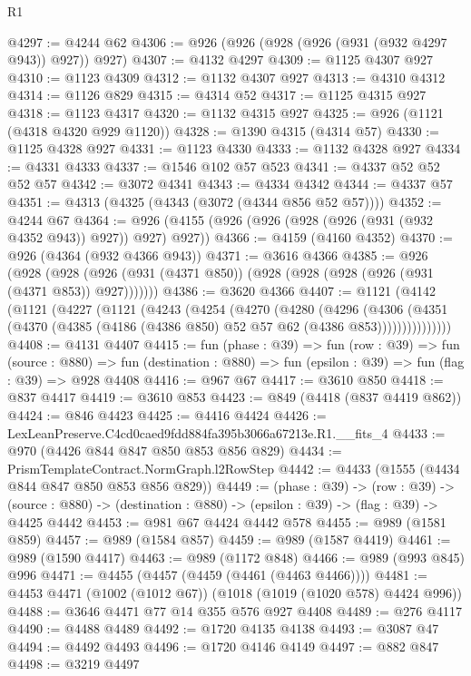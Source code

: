 \begin{lexlean}{R1}
\begin{coremodule}
@4297 := @4244 @62
@4306 := @926 (@926 (@928 (@926 (@931 (@932 @4297 @943)) @927)) @927)
@4307 := @4132 @4297
@4309 := @1125 @4307 @927
@4310 := @1123 @4309
@4312 := @1132 @4307 @927
@4313 := @4310 @4312
@4314 := @1126 @829
@4315 := @4314 @52
@4317 := @1125 @4315 @927
@4318 := @1123 @4317
@4320 := @1132 @4315 @927
@4325 := @926 (@1121 (@4318 @4320 @929 @1120))
@4328 := @1390 @4315 (@4314 @57)
@4330 := @1125 @4328 @927
@4331 := @1123 @4330
@4333 := @1132 @4328 @927
@4334 := @4331 @4333
@4337 := @1546 @102 @57 @523
@4341 := @4337 @52 @52 @52 @57
@4342 := @3072 @4341
@4343 := @4334 @4342
@4344 := @4337 @57
@4351 := @4313 (@4325 (@4343 (@3072 (@4344 @856 @52 @57))))
@4352 := @4244 @67
@4364 := @926 (@4155 (@926 (@926 (@928 (@926 (@931 (@932 @4352 @943)) @927)) @927) @927))
@4366 := @4159 (@4160 @4352)
@4370 := @926 (@4364 (@932 @4366 @943))
@4371 := @3616 @4366
@4385 := @926
    (@928 (@928 (@926 (@931 (@4371 @850)) (@928 (@928 (@928 (@926 (@931 (@4371 @853)) @927)))))))
@4386 := @3620 @4366
@4407 := @1121
    (@4142
      (@1121
        (@4227
          (@1121
            (@4243
              (@4254
                (@4270
                  (@4280
                    (@4296
                      (@4306
                        (@4351
                          (@4370 (@4385 (@4186 (@4386 @850) @52 @57 @62 (@4386 @853)))))))))))))))
@4408 := @4131 @4407
@4415 := fun (phase : @39) =>
  fun (row : @39) =>
  fun (source : @880) =>
  fun (destination : @880) => fun (epsilon : @39) => fun (flag : @39) => @928 @4408
@4416 := @967 @67
@4417 := @3610 @850
@4418 := @837 @4417
@4419 := @3610 @853
@4423 := @849 (@4418 (@837 @4419 @862))
@4424 := @846 @4423
@4425 := @4416 @4424
@4426 := LexLeanPreserve.C4cd0caed9fdd884fa395b3066a67213e.R1.__fits_4
@4433 := @970 (@4426 @844 @847 @850 @853 @856 @829)
@4434 := PrismTemplateContract.NormGraph.l2RowStep
@4442 := @4433 (@1555 (@4434 @844 @847 @850 @853 @856 @829))
@4449 := (phase : @39) ->
  (row : @39) ->
  (source : @880) -> (destination : @880) -> (epsilon : @39) -> (flag : @39) -> @4425 @4442
@4453 := @981 @67 @4424 @4442 @578
@4455 := @989 (@1581 @859)
@4457 := @989 (@1584 @857)
@4459 := @989 (@1587 @4419)
@4461 := @989 (@1590 @4417)
@4463 := @989 (@1172 @848)
@4466 := @989 (@993 @845) @996
@4471 := @4455 (@4457 (@4459 (@4461 (@4463 @4466))))
@4481 := @4453 @4471 (@1002 (@1012 @67)) (@1018 (@1019 (@1020 @578) @4424 @996))
@4488 := @3646 @4471 @77 @14 @355 @576 @927 @4408
@4489 := @276 @4117
@4490 := @4488 @4489
@4492 := @1720 @4135 @4138
@4493 := @3087 @47
@4494 := @4492 @4493
@4496 := @1720 @4146 @4149
@4497 := @882 @847
@4498 := @3219 @4497

\end{coremodule}
\end{lexlean}
